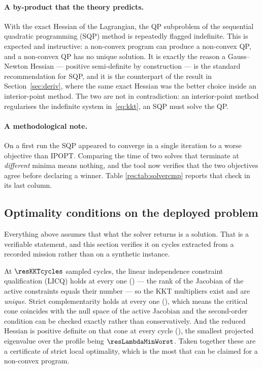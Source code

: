 \documentclass[11pt,a4paper]{article}
\begin{document}
\paragraph{A by-product that the theory predicts.} With the exact Hessian of the Lagrangian, the QP subproblem of the sequential quadratic
programming (SQP) method is repeatedly flagged indefinite. This is expected and instructive: a non-convex
program can produce a non-convex QP, and a non-convex QP has no unique solution. It is exactly the reason a
Gauss--Newton Hessian --- positive semi-definite by construction --- is the standard recommendation for SQP,
and it is the counterpart of the result in Section~\ref{sec:deriv}, where the same exact Hessian was the
better choice inside an interior-point method. The two are not in contradiction: an interior-point method
regularises the indefinite system in~\eqref{eq:kkt}, an SQP must solve the QP.

\paragraph{A methodological note.} On a first run the SQP appeared to converge in a single iteration to a
worse objective than IPOPT. Comparing the time of two solves that terminate at \emph{different} minima means
nothing, and the tool now verifies that the two objectives agree before declaring a winner. Table
\ref{res:tab:solvercmp} reports that check in its last column.

\subsection{Optimality conditions on the deployed problem}
\label{sec:kkt}

Everything above assumes that what the solver returns is a solution. That is a verifiable statement, and this
section verifies it on cycles extracted from a recorded mission rather than on a synthetic instance.

\begin{table}[htbp]
  \centering
  \small
  \caption{Optimality diagnostics at sampled cycles of the recorded run \resBag. ``active'' counts equalities and active bounds together; ``rank'' is the rank of the Jacobian of the active constraints, so LICQ holds when the two coincide.}
  \label{res:tab:kkt}
\end{table}

At $\resKKTcycles$ sampled cycles, the linear independence constraint qualification (LICQ) holds at every one (\resLICQalways) --- the rank of the Jacobian of
the active constraints equals their number --- so the KKT multipliers exist and are \emph{unique}. Strict
complementarity holds at every one (\resStrictAlways), which means the critical cone coincides with the null
space of the active Jacobian and the second-order condition can be checked exactly rather than
conservatively. And the reduced Hessian is positive definite on that cone at every cycle
(\resSOCalways), the smallest projected eigenvalue over the profile being $\resLambdaMinWorst$. Taken
together these are a certificate of strict local optimality, which is the most that can be claimed for a
non-convex program.
\end{document}
